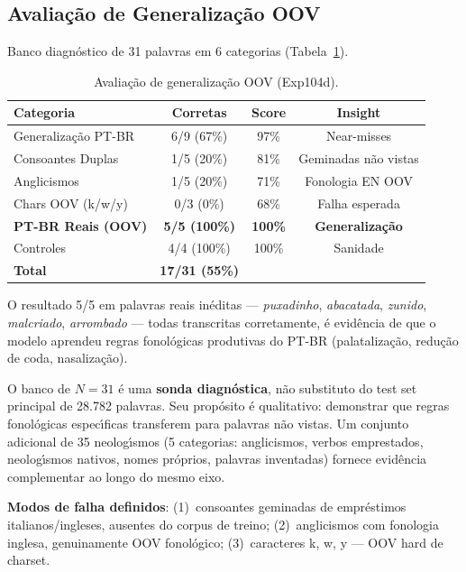 \documentclass[12pt]{article}
\begin{document}
\subsection{Avalia\c{c}\~ao de Generaliza\c{c}\~ao OOV}

Banco diagn\'ostico de 31 palavras em 6 categorias
(Tabela~\ref{tab:oov}).

\begin{table}[ht]
\centering
\caption{Avalia\c{c}\~ao de generaliza\c{c}\~ao OOV (Exp104d).}
\label{tab:oov}
\begin{tabular}{lccc}
\toprule
\textbf{Categoria} & \textbf{Corretas} & \textbf{Score} & \textbf{Insight} \\
\midrule
Generaliza\c{c}\~ao PT-BR & 6/9 (67\%) & 97\% & Near-misses \\
Consoantes Duplas   & 1/5 (20\%) & 81\% & Geminadas n\~ao vistas \\
Anglicismos         & 1/5 (20\%) & 71\% & Fonologia EN OOV \\
Chars OOV (k/w/y)   & 0/3 (0\%)  & 68\% & Falha esperada \\
\textbf{PT-BR Reais (OOV)} & \textbf{5/5 (100\%)} & \textbf{100\%}
  & \textbf{Generaliza\c{c}\~ao} \\
Controles           & 4/4 (100\%) & 100\% & Sanidade \\
\midrule
\textbf{Total} & \textbf{17/31 (55\%)} & & \\
\bottomrule
\end{tabular}
\end{table}

O resultado 5/5 em palavras reais in\'editas --- \emph{puxadinho},
\emph{abacatada}, \emph{zunido}, \emph{malcriado}, \emph{arrombado} ---
todas transcritas corretamente, \'e evid\^encia de que o modelo aprendeu
regras fonol\'ogicas produtivas do PT-BR (palataliza\c{c}\~ao,
redu\c{c}\~ao de coda, nasaliza\c{c}\~ao).

O banco de $N{=}31$ \'e uma \textbf{sonda diagn\'ostica}, n\~ao
substituto do test set principal de 28.782 palavras. Seu prop\'osito
\'e qualitativo: demonstrar que regras fonol\'ogicas espec\'{\i}ficas
transferem para palavras n\~ao vistas. Um conjunto adicional de 35
neolog\'{\i}smos (5 categorias: anglicismos, verbos emprestados,
neolog\'{\i}smos nativos, nomes pr\'oprios, palavras inventadas)
fornece evid\^encia complementar ao longo do mesmo eixo.

\textbf{Modos de falha definidos}: (1)~consoantes geminadas de
empr\'estimos italianos/ingleses, ausentes do corpus de treino;
(2)~anglicismos com fonologia inglesa, genuinamente OOV
fonol\'ogico; (3)~caracteres k, w, y --- OOV hard de charset.
\end{document}
